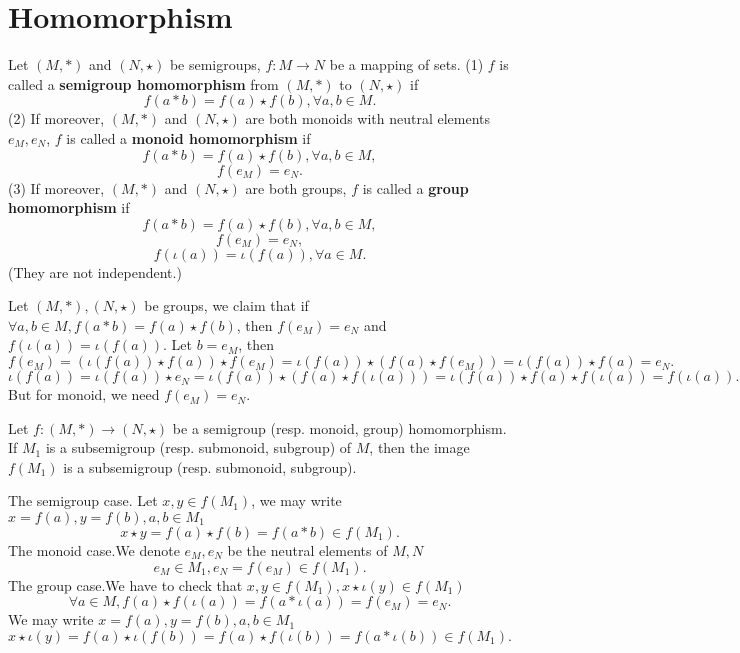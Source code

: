 \section{Homomorphism}
\begin{definitionenv}
    Let $(M, *)$ and $(N, \star)$ be  semigroups,  $f:M\rightarrow N$ be a mapping of sets.
    \newline
    (1) $f$ is called a \textbf{semigroup homomorphism} from $(M, *)$ to $(N, \star)$ if
    $$f(a*b)=f(a)\star f(b), \forall a, b\in M.$$
    (2) If moreover,  $(M, *)$ and $(N, \star)$ are both monoids with neutral elements $e_M, e_N$,  $f$ is called a \textbf{monoid homomorphism} if 
     $$f(a*b)=f(a)\star f(b), \forall a, b\in M, $$ 
     $$f(e_M)=e_N.$$
    (3) If moreover,  $(M, *)$ and $(N, \star)$ are both groups,  $f$ is called a \textbf{group homomorphism} if 
    $$f(a*b)=f(a)\star f(b), \forall a, b\in M, $$
    $$f(e_M)=e_N, $$
    $$f(\iota(a))=\iota(f(a)), \forall a\in M.$$
    (They are not independent.)
\end{definitionenv}
\begin{remark}
    Let $(M,*),(N,\star)$ be groups, we claim that if $\forall a,b\in M,f(a*b)=f(a)\star f(b)$, then $f(e_M)=e_N$ and $f(\iota(a))=\iota(f(a))$. 
    Let $b=e_M$, then 
    {\small
    $$ f(e_M)=\left(\iota(f(a))\star f(a)\right)\star f(e_M)=\iota(f(a))\star\left( f(a)\star f(e_M)\right)=\iota(f(a))\star f(a)=e_N.$$
    $$\iota(f(a))=\iota(f(a))\star e_N=\iota(f(a))\star\left(f(a)\star f(\iota(a))\right)=\iota(f(a))\star f(a)\star f(\iota(a))=f(\iota(a)).$$
    }
    But for monoid,  we need $f(e_M)=e_N$.
\end{remark}
\begin{propositionenv}
    \quad 
    \newline
    Let $f:(M, *)\rightarrow (N, \star)$ be a semigroup (resp. monoid, group) homomorphism. If $M_1$ is a subsemigroup (resp. submonoid, subgroup) of $M$,  then the image $f(M_1)$ is a subsemigroup (resp. submonoid, subgroup).
\end{propositionenv}
\begin{proofenv}
    The semigroup case. Let $x, y\in f(M_1)$,  we may write $x=f(a), y=f(b), a, b\in M_1$
    $$x\star y=f(a)\star f(b)=f(a*b)\in f(M_1).$$
    The monoid case.We denote $e_M, e_N$ be the neutral elements of $M, N$
    $$e_M\in M_1, e_N=f(e_M)\in f(M_1).$$
    The group case.We have to check that $x, y\in f(M_1), x\star \iota(y)\in f(M_1)$
    $$\forall a\in M,  f(a)\star f(\iota(a))=f(a*\iota(a))=f(e_M)=e_N.$$
    We may write $x=f(a), y=f(b), a, b\in M_1$
    $$x\star \iota(y)=f(a)\star\iota(f(b))=f(a)\star f(\iota(b))=f(a*\iota(b))\in f(M_1).$$
\end{proofenv}
